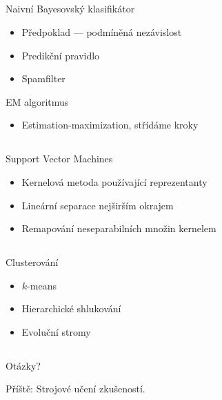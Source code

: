 \documentclass{beamer}
\begin{document}
\subsection{}
\begin{frame}{Naivní Bayesovský klasifikátor}
\begin{itemize}
\item Předpoklad --- podmíněná nezávislost
\item Predikční pravidlo
\item Spamfilter
\end{itemize}
\begin{block}{EM algoritmus}
\begin{itemize}
\item Estimation-maximization, střídáme kroky
\end{itemize}
\end{block}
\end{frame}

\subsection{}
\begin{frame}{Support Vector Machines}
\begin{itemize}
\item Kernelová metoda používající reprezentanty
\item Lineární separace nejširším okrajem
\item Remapování neseparabilních množin kernelem
\end{itemize}
\end{frame}

\subsection{}
\begin{frame}{Clusterování}
\begin{itemize}
\item $k$-means
\item Hierarchické shlukování
\item Evoluční stromy
\end{itemize}
\end{frame}

\subsection{}
\begin{frame}{Otázky?}
\begin{center}
Příště: Strojové učení zkušeností.
\end{center}
\end{frame}
\end{document}
